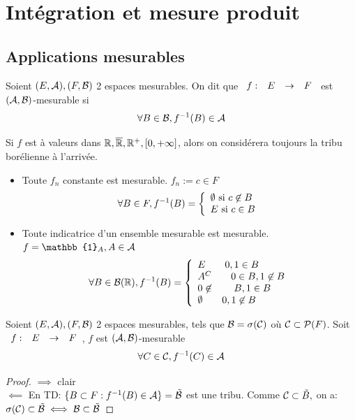 \documentclass[]{report}
\begin{document}
    \chapter{Intégration et mesure produit}

    \section{Applications mesurables}

    \begin{df}{}{}
        Soient $(E,\mathcal{A}),(F,\mathcal{B})$ 2 espaces mesurables. On dit que $\begin{array}{ccccc} f : & E & \to & F \end{array}$ est $(\mathcal{A},\mathcal{B})$-mesurable si
        \[\forall B\in\mathcal{B},f^{-1}(B)\in\mathcal{A}\]
    \end{df}

    \begin{re}{}{}
        Si $f$ est à valeurs dans $\mathbb{R},\overline{\mathbb{R}},\mathbb{R}^+,\left[0,+\infty\right]$, alors on considérera toujours la tribu borélienne à l'arrivée.
    \end{re}

    \begin{ex}{}{}
        \begin{itemize}
            \item Toute $f_n$ constante est mesurable. $f_n:= c\in F$
            \[\forall B\in F,f^{-1}(B)=\left\{\begin{array}{ll} \emptyset\text{ si }c\not\in B\\E\text{ si }c\in B \end{array} \right.\]
            \item Toute indicatrice d'un ensemble mesurable est mesurable. $f=\mathbb{1}_A,A\in\Ar$
            \[\forall B\in\mathcal{B}(\mathbb{R}),f^{-1}(B)=\left\{\begin{array}{ll} E \qquad 0,1\in B\\A^C\qquad 0\in B,1\not\in B \\0\not\in\qquad B,1\in B \\ \emptyset\qquad 0,1\not\in B \end{array} \right.\]
        \end{itemize}
    \end{ex}

    \begin{prop}{}{}
        Soient $(E,\mathcal{A}),(F,\mathcal{B})$ 2 espaces mesurables, tels que $\mathcal{B}=\sigma(\mathcal{C})$ où $\mathcal{C}\subset\mathcal{P}(F)$. Soit $\begin{array}{ccccc} f : & E & \to & F \end{array}$, $f$ est $(\mathcal{A},\mathcal{B})$-mesurable \ssi 
        \[\forall C\in \mathcal{C},f^{-1}(C)\in\mathcal{A}\]
    \end{prop}

    \begin{proof}{}{}
        $\implies$ clair\\
        $\impliedby$ En TD: $\{B\subset F: f^{-1}(B)\in \mathcal{A}\}=\tilde{\mathcal{B}}$ est une tribu. Comme $\mathcal{C}\subset \tilde{B},$ on a: $\sigma(\mathcal{C})\subset\tilde{\mathcal{B}}\iff\mathcal{B}\subset\tilde{\mathcal{B}}$
    \end{proof}
\end{document}
